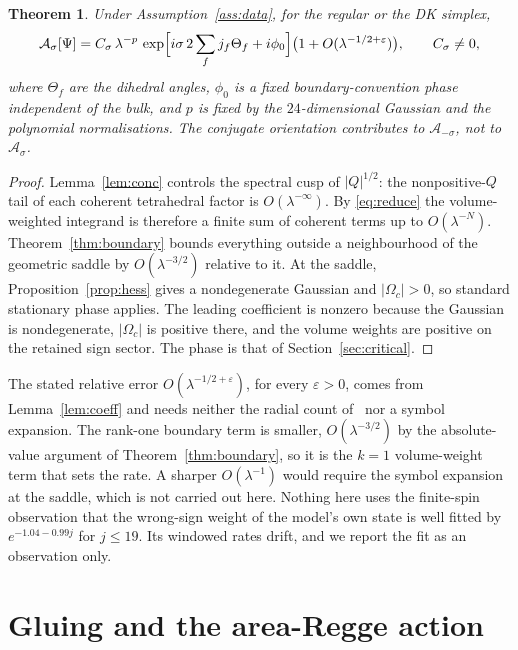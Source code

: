 \documentclass[11pt]{article}
\numberwithin{equation}{section}
\newtheorem{theorem}{Theorem}[section]
\theoremstyle{definition}
\theoremstyle{remark}
\begin{document}
\begin{theorem}\label{thm:main}
Under Assumption~\ref{ass:data}, for the regular or the DK simplex,
\[
\mathcal A_\sigma[\Psi]
=C_\sigma\,\lambda^{-p}\,
\exp\Bigl[i\sigma\,2\sum_f j_f\Theta_f+i\phi_0\Bigr]\bigl(1+O(\lambda^{-1/2+\varepsilon})\bigr),
\qquad C_\sigma\neq0,
\]
where $\Theta_f$ are the dihedral angles, $\phi_0$ is a fixed boundary-convention
phase independent of the bulk, and $p$ is fixed by the $24$-dimensional Gaussian
and the polynomial normalisations. The conjugate orientation contributes to
$\mathcal A_{-\sigma}$, not to $\mathcal A_\sigma$.
\end{theorem}

\begin{proof}
Lemma~\ref{lem:conc} controls the spectral cusp of $|Q|^{1/2}$: the
nonpositive-$Q$ tail of each coherent tetrahedral factor is
$O(\lambda^{-\infty})$. By \eqref{eq:reduce} the volume-weighted integrand is
therefore a finite sum of coherent terms up to $O(\lambda^{-N})$. Theorem~\ref{thm:boundary} bounds
everything outside a neighbourhood of the geometric saddle by $O(\lambda^{-3/2})$
relative to it. At the saddle, Proposition~\ref{prop:hess} gives a nondegenerate
Gaussian and $|\Omega_c|>0$, so standard stationary phase applies. The leading
coefficient is nonzero because the Gaussian is nondegenerate, $|\Omega_c|$ is
positive there, and the volume weights are positive on the retained sign sector.
The phase is that of Section~\ref{sec:critical}.
\end{proof}

The stated relative error $O(\lambda^{-1/2+\varepsilon})$, for every
$\varepsilon>0$, comes from Lemma~\ref{lem:coeff} and needs neither the radial
count of~\cite{W2vertex} nor a symbol expansion. The rank-one boundary term is
smaller, $O(\lambda^{-3/2})$ by the absolute-value argument of
Theorem~\ref{thm:boundary}, so it is the $k=1$ volume-weight term that sets the
rate. A sharper $O(\lambda^{-1})$ would require the symbol expansion at the
saddle, which is not carried out here. Nothing here uses the finite-spin observation that the
wrong-sign weight of the model's own state is well fitted by $e^{-1.04-0.99j}$ for
$j\le19$. Its windowed rates drift, and we report the fit as an observation only.

\section{Gluing and the area-Regge action}\label{sec:r3}
\end{document}
